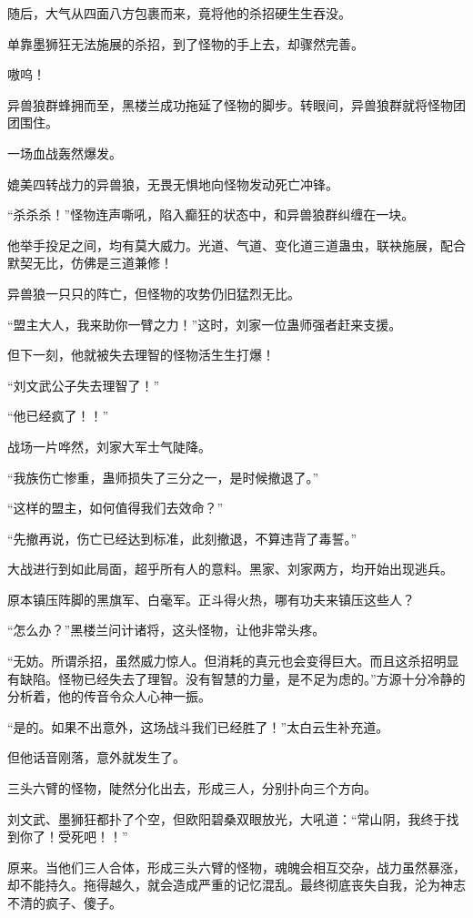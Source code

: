 \begin{this_body}
随后，大气从四面八方包裹而来，竟将他的杀招硬生生吞没。

单靠墨狮狂无法施展的杀招，到了怪物的手上去，却骤然完善。

嗷呜！

异兽狼群蜂拥而至，黑楼兰成功拖延了怪物的脚步。转眼间，异兽狼群就将怪物团团围住。

一场血战轰然爆发。

媲美四转战力的异兽狼，无畏无惧地向怪物发动死亡冲锋。

“杀杀杀！”怪物连声嘶吼，陷入癫狂的状态中，和异兽狼群纠缠在一块。

他举手投足之间，均有莫大威力。光道、气道、变化道三道蛊虫，联袂施展，配合默契无比，仿佛是三道兼修！

异兽狼一只只的阵亡，但怪物的攻势仍旧猛烈无比。

“盟主大人，我来助你一臂之力！”这时，刘家一位蛊师强者赶来支援。

但下一刻，他就被失去理智的怪物活生生打爆！

“刘文武公子失去理智了！”

“他已经疯了！！”

战场一片哗然，刘家大军士气陡降。

“我族伤亡惨重，蛊师损失了三分之一，是时候撤退了。”

“这样的盟主，如何值得我们去效命？”

“先撤再说，伤亡已经达到标准，此刻撤退，不算违背了毒誓。”

大战进行到如此局面，超乎所有人的意料。黑家、刘家两方，均开始出现逃兵。

原本镇压阵脚的黑旗军、白毫军。正斗得火热，哪有功夫来镇压这些人？

“怎么办？”黑楼兰问计诸将，这头怪物，让他非常头疼。

“无妨。所谓杀招，虽然威力惊人。但消耗的真元也会变得巨大。而且这杀招明显有缺陷。怪物已经失去了理智。没有智慧的力量，是不足为虑的。”方源十分冷静的分析着，他的传音令众人心神一振。

“是的。如果不出意外，这场战斗我们已经胜了！”太白云生补充道。

但他话音刚落，意外就发生了。

三头六臂的怪物，陡然分化出去，形成三人，分别扑向三个方向。

刘文武、墨狮狂都扑了个空，但欧阳碧桑双眼放光，大吼道：“常山阴，我终于找到你了！受死吧！！”

原来。当他们三人合体，形成三头六臂的怪物，魂魄会相互交杂，战力虽然暴涨，却不能持久。拖得越久，就会造成严重的记忆混乱。最终彻底丧失自我，沦为神志不清的疯子、傻子。


\end{this_body}
